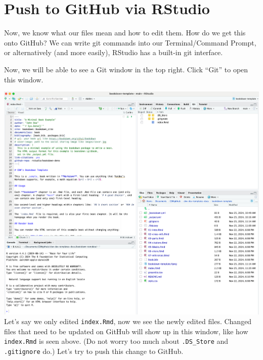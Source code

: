 \documentclass[
]{book}
\theoremstyle{definition}
\theoremstyle{definition}
\theoremstyle{definition}
\theoremstyle{definition}
\theoremstyle{remark}
\begin{document}
\section{Push to GitHub via RStudio}\label{push-to-github-via-rstudio}

Now, we know what our files mean and how to edit them. How do we get this onto GitHub? We can write git commands into our Terminal/Command Prompt, or alternatively (and more easily), RStudio has a built-in git interface.

Now, we will be able to see a Git window in the top right. Click ``Git'' to open this window.

\includegraphics{img/git-instruct/RStudio-with-git-window-open.png}\\

Let's say we only edited \texttt{index.Rmd}, now we see the newly edited files. Changed files that need to be updated on GitHub will show up in this window, like how \texttt{index.Rmd} is seen above. (Do not worry too much about \texttt{.DS\_Store} and \texttt{.gitignore} do.) Let's try to push this change to GitHub.
\end{document}
